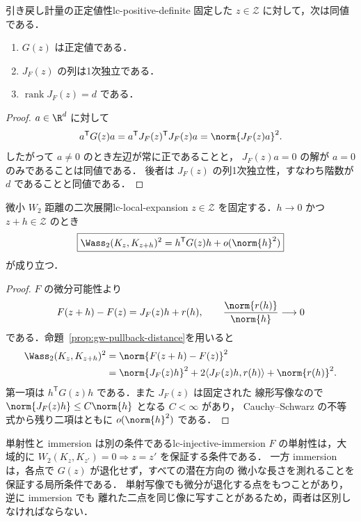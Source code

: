 \begin{proposition}{引き戻し計量の正定値性}{lc-positive-definite}
  固定した $z\in\mathcal{Z}$ に対して，次は同値である．
  \begin{enumerate}
    \item $G(z)$ は正定値である．
    \item $J_F(z)$ の列は1次独立である．
    \item $\operatorname{rank}J_F(z)=d$ である．
  \end{enumerate}
\end{proposition}

\begin{proof}
  $a\in\R^d$ に対して
  \[
    a^{\mathsf T}G(z)a
    =a^{\mathsf T}J_F(z)^{\mathsf T}J_F(z)a
    =\norm{J_F(z)a}^2.
  \]
  したがって $a\neq0$ のとき左辺が常に正であることと，
  $J_F(z)a=0$ の解が $a=0$ のみであることは同値である．
  後者は $J_F(z)$ の列1次独立性，すなわち階数が $d$ であることと同値である．
\end{proof}

\begin{theorem}{微小 $W_2$ 距離の二次展開}{lc-local-expansion}
  $z\in\mathcal{Z}$ を固定する．$h\to0$ かつ $z+h\in\mathcal{Z}$ のとき
  \[
    \boxed{
      \Wass_2(K_z,K_{z+h})^2
      =h^{\mathsf T}G(z)h+o(\norm{h}^2)
    }
  \]
  が成り立つ．
\end{theorem}

\begin{proof}
  $F$ の微分可能性より
  \[
    F(z+h)-F(z)=J_F(z)h+r(h),
    \qquad
    \frac{\norm{r(h)}}{\norm{h}}\longrightarrow0
  \]
  である．命題~\ref{prop:gw-pullback-distance}を用いると
  \[
    \begin{aligned}
      \Wass_2(K_z,K_{z+h})^2
      &=\norm{F(z+h)-F(z)}^2\\
      &=\norm{J_F(z)h}^2
        +2\langle J_F(z)h,r(h)\rangle+\norm{r(h)}^2.
    \end{aligned}
  \]
  第一項は $h^{\mathsf T}G(z)h$ である．また $J_F(z)$ は固定された
  線形写像なので $\norm{J_F(z)h}\leq C\norm{h}$ となる $C<\infty$ があり，
  Cauchy--Schwarz の不等式から残り二項はともに $o(\norm{h}^2)$ である．
\end{proof}

\begin{remark}{単射性と immersion は別の条件である}{lc-injective-immersion}
  $F$ の単射性は，大域的に
  $W_2(K_z,K_{z'})=0\Rightarrow z=z'$ を保証する条件である．
  一方 immersion は，各点で $G(z)$ が退化せず，すべての潜在方向の
  微小な長さを測れることを保証する局所条件である．
  単射写像でも微分が退化する点をもつことがあり，逆に immersion でも
  離れた二点を同じ像に写すことがあるため，両者は区別しなければならない．
\end{remark}

